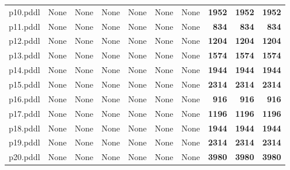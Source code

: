 \documentclass{article}
\begin{document}
\begin{tabular}{@{}lrrrrrrrrr@{}}
p10.pddl & \multicolumn{1}{|l|}{None} & \multicolumn{1}{|l|}{None} & \multicolumn{1}{|l|}{None} & \multicolumn{1}{|l|}{None} & \multicolumn{1}{|l|}{None} & \multicolumn{1}{|l|}{None} & \textbf{1952} & \textbf{1952} & \textbf{1952} \\
p11.pddl & \multicolumn{1}{|l|}{None} & \multicolumn{1}{|l|}{None} & \multicolumn{1}{|l|}{None} & \multicolumn{1}{|l|}{None} & \multicolumn{1}{|l|}{None} & \multicolumn{1}{|l|}{None} & \textbf{834} & \textbf{834} & \textbf{834} \\
p12.pddl & \multicolumn{1}{|l|}{None} & \multicolumn{1}{|l|}{None} & \multicolumn{1}{|l|}{None} & \multicolumn{1}{|l|}{None} & \multicolumn{1}{|l|}{None} & \multicolumn{1}{|l|}{None} & \textbf{1204} & \textbf{1204} & \textbf{1204} \\
p13.pddl & \multicolumn{1}{|l|}{None} & \multicolumn{1}{|l|}{None} & \multicolumn{1}{|l|}{None} & \multicolumn{1}{|l|}{None} & \multicolumn{1}{|l|}{None} & \multicolumn{1}{|l|}{None} & \textbf{1574} & \textbf{1574} & \textbf{1574} \\
p14.pddl & \multicolumn{1}{|l|}{None} & \multicolumn{1}{|l|}{None} & \multicolumn{1}{|l|}{None} & \multicolumn{1}{|l|}{None} & \multicolumn{1}{|l|}{None} & \multicolumn{1}{|l|}{None} & \textbf{1944} & \textbf{1944} & \textbf{1944} \\
p15.pddl & \multicolumn{1}{|l|}{None} & \multicolumn{1}{|l|}{None} & \multicolumn{1}{|l|}{None} & \multicolumn{1}{|l|}{None} & \multicolumn{1}{|l|}{None} & \multicolumn{1}{|l|}{None} & \textbf{2314} & \textbf{2314} & \textbf{2314} \\
p16.pddl & \multicolumn{1}{|l|}{None} & \multicolumn{1}{|l|}{None} & \multicolumn{1}{|l|}{None} & \multicolumn{1}{|l|}{None} & \multicolumn{1}{|l|}{None} & \multicolumn{1}{|l|}{None} & \textbf{916} & \textbf{916} & \textbf{916} \\
p17.pddl & \multicolumn{1}{|l|}{None} & \multicolumn{1}{|l|}{None} & \multicolumn{1}{|l|}{None} & \multicolumn{1}{|l|}{None} & \multicolumn{1}{|l|}{None} & \multicolumn{1}{|l|}{None} & \textbf{1196} & \textbf{1196} & \textbf{1196} \\
p18.pddl & \multicolumn{1}{|l|}{None} & \multicolumn{1}{|l|}{None} & \multicolumn{1}{|l|}{None} & \multicolumn{1}{|l|}{None} & \multicolumn{1}{|l|}{None} & \multicolumn{1}{|l|}{None} & \textbf{1944} & \textbf{1944} & \textbf{1944} \\
p19.pddl & \multicolumn{1}{|l|}{None} & \multicolumn{1}{|l|}{None} & \multicolumn{1}{|l|}{None} & \multicolumn{1}{|l|}{None} & \multicolumn{1}{|l|}{None} & \multicolumn{1}{|l|}{None} & \textbf{2314} & \textbf{2314} & \textbf{2314} \\
p20.pddl & \multicolumn{1}{|l|}{None} & \multicolumn{1}{|l|}{None} & \multicolumn{1}{|l|}{None} & \multicolumn{1}{|l|}{None} & \multicolumn{1}{|l|}{None} & \multicolumn{1}{|l|}{None} & \textbf{3980} & \textbf{3980} & \textbf{3980} \\
\end{tabular}
\end{document}
